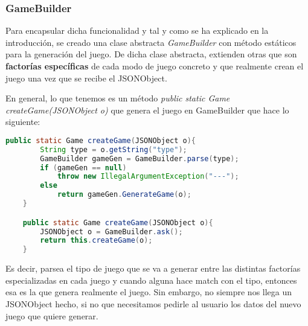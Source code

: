 \documentclass{article}
\begin{document}
\subsubsection*{GameBuilder}
Para encapsular dicha funcionalidad y tal y como se ha explicado en la introducción, se creado una clase abstracta \textit{GameBuilder} con método estáticos para la generación del juego. De dicha clase abstracta, extienden otras que son \textbf{factorías específicas} de cada modo de juego concreto y que realmente crean el juego una vez que se recibe el JSONObject.

En general, lo que tenemos es un método \textit{public static Game createGame(JSONObject o)} que genera el juego en GameBuilder que hace lo siguiente:
\begin{center}
\begin{lstlisting}[language=Java]
	public static Game createGame(JSONObject o){
		String type = o.getString("type");
		GameBuilder gameGen = GameBuilder.parse(type);
		if (gameGen == null)
			throw new IllegalArgumentException("---");
		else
			return gameGen.GenerateGame(o);		
	}

	public static Game createGame(JSONObject o){
		JSONObject o = GameBuilder.ask();
		return this.createGame(o); 
	}
\end{lstlisting}
\end{center}
Es decir, parsea el tipo de juego que se va a generar entre las distintas factorías especializadas en cada juego y cuando alguna hace match con el tipo, entonces esa es la que genera realmente el juego. Sin embargo, no siempre nos llega un JSONObject hecho, si no que necesitamos pedirle al usuario los datos del nuevo juego que quiere generar.
\end{document}

